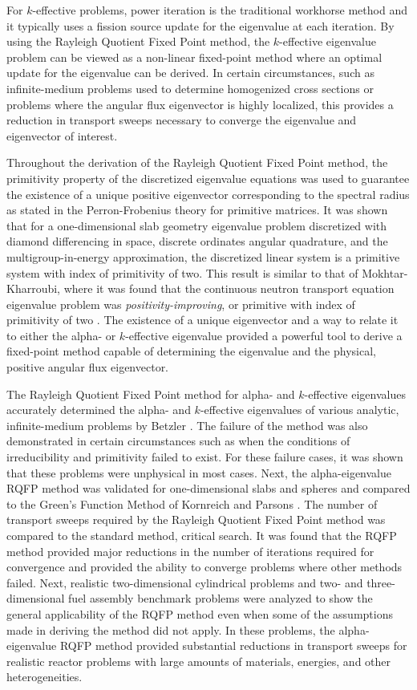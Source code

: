 For $k$-effective problems, power iteration is the traditional workhorse method and it typically uses a fission source update for the eigenvalue at each iteration. By using the Rayleigh Quotient Fixed Point method, the $k$-effective eigenvalue problem can be viewed as a non-linear fixed-point method where an optimal update for the eigenvalue can be derived. In certain circumstances, such as infinite-medium problems used to determine homogenized cross sections or problems where the angular flux eigenvector is highly localized, this provides a reduction in transport sweeps necessary to converge the eigenvalue and eigenvector of interest.

Throughout the derivation of the Rayleigh Quotient Fixed Point method, the primitivity property of the discretized eigenvalue equations was used to guarantee the existence of a unique positive eigenvector corresponding to the spectral radius as stated in the Perron-Frobenius theory for primitive matrices. It was shown that for a one-dimensional slab geometry eigenvalue problem discretized with diamond differencing in space, discrete ordinates angular quadrature, and the multigroup-in-energy approximation, the discretized linear system is a primitive system with index of primitivity of two. This result is similar to that of Mokhtar-Kharroubi, where it was found that the continuous neutron transport equation eigenvalue problem was \textit{positivity-improving}, or primitive with index of primitivity of two \cite{mokhtar1997mathematical}. The existence of a unique eigenvector and a way to relate it to either the alpha- or $k$-effective eigenvalue provided a powerful tool to derive a fixed-point method capable of determining the eigenvalue and the physical, positive angular flux eigenvector.

The Rayleigh Quotient Fixed Point method for alpha- and $k$-effective eigenvalues accurately determined the alpha- and $k$-effective eigenvalues of various analytic, infinite-medium problems by Betzler \cite{Betzler2014Alpha}. The failure of the method was also demonstrated in certain circumstances such as when the conditions of irreducibility and primitivity failed to exist. For these failure cases, it was shown that these problems were unphysical in most cases. Next, the alpha-eigenvalue RQFP method was validated for one-dimensional slabs and spheres and compared to the Green's Function Method of Kornreich and Parsons \cite{kornreich_timeeigenvalue_2005}. The number of transport sweeps required by the Rayleigh Quotient Fixed Point method was compared to the standard method, critical search. It was found that the RQFP method provided major reductions in the number of iterations required for convergence and provided the ability to converge problems where other methods failed. Next, realistic two-dimensional cylindrical problems and two- and three-dimensional fuel assembly benchmark problems were analyzed to show the general applicability of the RQFP method  even when some of the assumptions made in deriving the method did not apply. In these problems, the alpha-eigenvalue RQFP method provided substantial reductions in transport sweeps for realistic reactor problems with large amounts of materials, energies, and other heterogeneities.

